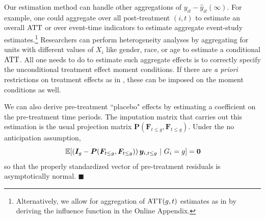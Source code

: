 \begin{remark}

Our estimation method can handle other aggregations of $y_{it} - \hat{y}_{it}(\infty)$. For example, one could aggregate over all post-treatment $(i,t)$ to estimate an overall $\text{ATT}$ or over event-time indicators to estimate aggregate event-study estimates.\footnote{Alternatively, we allow for aggregation of $\text{ATT}(g,t)$ estimates as in \citet{Callaway_Santanna_2021} by deriving the influence function in the Online Appendix.
} Researchers can perform heterogeneity analyses by aggregating for units with different values of $X_i$ like gender, race, or age to estimate a conditional $\text{ATT}$. All one needs to do to estimate such aggregate effects is to correctly specify the unconditional treatment effect moment conditions. If there are \textit{a priori} restrictions on treatment effects as in \citet{Borusyak_Jaravel_Spiess_2021}, these can be imposed on the moment conditions as well. 

We can also derive pre-treatment ``placebo" effects by estimating a coefficient on the pre-treatment time periods. The imputation matrix that carries out this estimation is the usual projection matrix $\bm P(\bm{F}_{t \leq g}, \bm{F}_{t \leq g})$. Under the no anticipation assumption, 
\begin{equation}
  \expec{ \left( \bm I_{g} - \bm P(\bm{F}_{t \leq g}, \bm{F}_{t \leq g}) \right) \bm y_{i, t \leq g}}{G_i = g} = \bm 0
\end{equation}
so that the properly standardized vector of pre-treatment residuals is asymptotically normal. $\blacksquare$
\end{remark}



